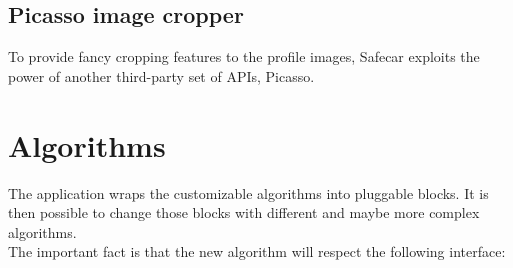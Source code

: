 \subsection{Picasso image cropper}
To provide fancy cropping features to the profile images, Safecar exploits the power of another third-party set of APIs, Picasso.

\section{Algorithms}
The application wraps the customizable algorithms into pluggable blocks. It is then possible to change those blocks with different and maybe more complex algorithms.\\
The important fact is that the new algorithm will respect the following interface:

